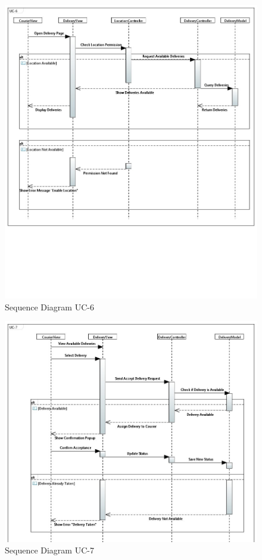 \begin{figure}[h!]
\begin{center}
\includegraphics[scale=0.5]{FIGS/SD-UC-6.jpeg}
    \caption{Sequence Diagram UC-6}
    \label{fig:seq_diag6}
\end{center}
\end{figure}

\begin{figure}[h!]
\begin{center}
\includegraphics[scale=0.35]{FIGS/SD-UC-7.JPG}
    \caption{Sequence Diagram UC-7}
    \label{fig:seq_diag7}
\end{center}
\end{figure}

